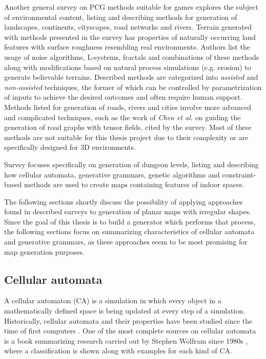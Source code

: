 \documentclass[12pt]{report}
\begin{document}
Another general survey on PCG methods suitable for games \autocite{de2011survey} explores the subject of environmental content, listing and describing methods for generation of landscapes, continents, cityscapes, road networks and rivers. Terrain generated with methods presented in the survey has properties of naturally occurring land features with surface roughness resembling real environments. Authors list the usage of noise algorithms, L-systems, fractals and combinations of these methods along with modifications based on natural process simulations (e.g. erosion) to generate believable terrains. Described methods are categorized into \textit{assisted} and \textit{non-assisted} techniques, the former of which can be controlled by parametrization of inputs to achieve the desired outcomes and often require human support. Methods listed for generation of roads, rivers and cities involve more advanced and complicated techniques, such as the work of \textit{Chen et al.} \autocite{Chen:2008:IPS:1360612.1360702} on guiding the generation of road graphs with tensor fields, cited by the survey. Most of these methods are not suitable for this thesis project due to their complexity or are specifically designed for 3D environments.

Survey \autocite{van2014procedural} focuses specifically on generation of dungeon levels, listing and describing how cellular automata, generative grammars, genetic algorithms and constraint-based methods are used to create maps containing features of indoor spaces.

The following sections shortly discuss the possibility of applying approaches found in described surveys to generation of planar maps with irregular shapes. Since the goal of this thesis is to build a generator which performs that process, the following sections focus on summarizing characteristics of cellular automata and generative grammars, as these approaches seem to be most promising for map generation purposes.

\subsection{Cellular automata}
A cellular automaton (CA) is a simulation in which every object in a mathematically defined space is being updated at every step of a simulation. Historically, cellular automata and their properties have been studied since the time of first computers \autocite{Sarkar:2000:BHC:349194.349202}. One of the most complete sources on cellular automata is a book summarizing research carried out by Stephen Wolfram since 1980s \autocite{wolfram2002new}, where a classification is shown along with examples for each kind of CA. 
\end{document}
